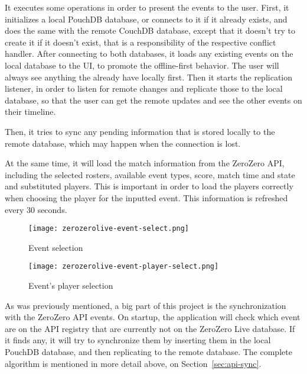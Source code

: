 It executes some operations in order to present the events to the user. First, it initializes a local PouchDB database, or connects to it if it already exists, and does the same with the remote CouchDB database, except that it doesn't try to create it if it doesn't exist, that is a responsibility of the respective conflict handler. After connecting to both databases, it loads any existing events on the local database to the UI, to promote the offline-first behavior. The user will always see anything the already have locally first. Then it starts the replication listener, in order to listen for remote changes and replicate those to the local database, so that the user can get the remote updates and see the other events on their timeline.

Then, it tries to sync any pending information that is stored locally to the remote database, which may happen when the connection is lost.

At the same time, it will load the match information from the ZeroZero API, including the selected rosters, available event types, score, match time and state and substituted players. This is important in order to load the players correctly when choosing the player for the inputted event. This information is refreshed every 30 seconds.

\begin{figure}[h]
    \begin{center}
        \leavevmode
        \texttt{[image: zerozerolive-event-select.png]}
        \caption{Event selection}
        \label{fig:zerozerolive-event-select}
    \end{center}
\end{figure}

\begin{figure}[h]
    \begin{center}
        \leavevmode
        \texttt{[image: zerozerolive-event-player-select.png]}
        \caption{Event's player selection}
        \label{fig:zerozerolive-event-player-select}
    \end{center}
\end{figure}

As was previously mentioned, a big part of this project is the synchronization with the ZeroZero API events. On startup, the application will check which event are on the API registry that are currently not on the ZeroZero Live database. If it finds any, it will try to synchronize them by inserting them in the local PouchDB database, and then replicating to the remote database. The complete algorithm is mentioned in more detail above, on Section~\ref{sec:api-sync}. 

